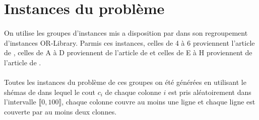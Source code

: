 \documentclass[12pt,letterpaper,twoside]{article}
\begin{document}
	\section{Instances du problème}
		\paragraph*{}
			On utilise les groupes d'instances mis a disposition par \citeauthor{OR-Library} dans son regroupement d'instances OR-Library\cite{OR-Library}. Parmis ces instances, celles de 4 à 6 proviennent l'article \cite{Balas1980} de \citeauthor{Balas1980}, celles de A à D proviennent de l'article \cite{Beasley1987} de \citeauthor{Beasley1987} et celles de E à H proviennent de l'article \cite{Beasley1990} de \citeauthor{Beasley1990}.
		\paragraph*{}
			Toutes les instances du problème de ces groupes on été générées en utilisant le shémas de \citeauthor{Balas1980}\cite{Balas1980} dans lequel le cout \(c_i\) de chaque colonne \(i\) est pris aléatoirement dans l'intervalle \(\llbracket0,100\rrbracket\), chaque colonne couvre au moins une ligne et chaque ligne est couverte par au moins deux clonnes.
\end{document}

